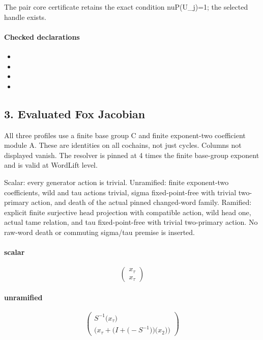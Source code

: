 The pair core certificate retains the exact condition nuP(U\_j)=1; the selected handle exists.

\paragraph{Checked declarations}
\begin{itemize}
\item {}
\item {}
\item {}
\item {}
\end{itemize}

\subsection*{3. Evaluated Fox Jacobian}
All three profiles use a finite base group C and finite exponent-two coefficient module A. These are identities on all cochains, not just cycles. Columns not displayed vanish. The resolver is pinned at 4 times the finite base-group exponent and is valid at WordLift level.

Scalar: every generator action is trivial. Unramified: finite exponent-two coefficients, wild and tau actions trivial, sigma fixed-point-free with trivial two-primary action, and death of the actual pinned changed-word family. Ramified: explicit finite surjective head projection with compatible action, wild head one, actual tame relation, and tau fixed-point-free with trivial two-primary action. No raw-word death or commuting sigma/tau premise is inserted.

\paragraph{scalar}
\[\begin{pmatrix}x_{\tau}\\x_{\tau}\end{pmatrix}\]
\paragraph{unramified}
\[\begin{pmatrix}S^{-1}\bigl(x_{\tau}\bigr)\\\bigl(x_{\tau}+\bigl(I+\bigl(-S^{-1}\bigr)\bigr)\bigl(x_{2}\bigr)\bigr)\end{pmatrix}\]
